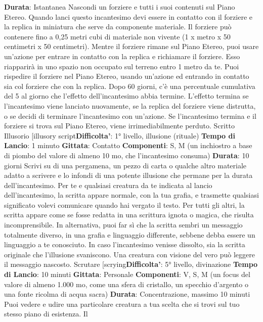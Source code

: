 \begin{multicols}{2}
\textbf{Durata}: Istantanea
Nascondi un forziere e tutti i suoi contenuti sul Piano
Etereo. Quando lanci questo incantesimo devi essere in
contatto con il forziere e la replica in miniatura che
serve da componente materiale. Il forziere può
contenere fino a 0,25 metri cubi di materiale non
vivente (1 x metro x 50 centimetri x 50 centimetri).
Mentre il forziere rimane sul Piano Etereo, puoi usare
un’azione per entrare in contatto con la replica e
richiamare il forziere. Esso riapparirà in uno spazio non
occupato sul terreno entro 1 metro da te. Puoi
rispedire il forziere nel Piano Etereo, usando un’azione
ed entrando in contatto sia col forziere che con la
replica.
Dopo 60 giorni, c’è una percentuale cumulativa del 5%
al giorno che l’effetto dell’incantesimo abbia termine.
L’effetto termina se l’incantesimo viene lanciato
nuovamente, se la replica del forziere viene distrutta, o
se decidi di terminare l’incantesimo con un’azione. Se
l’incantesimo termina e il forziere si trova sul Piano
Etereo, viene irrimediabilmente perduto.
Scritto Illusorio
[illusory script\textbf{Difficolta'}:
1° livello, illusione (rituale)
\textbf{Tempo di Lancio}: 1 minuto
\textbf{Gittata}: Contatto
\textbf{Componenti}: S, M (un inchiostro a base di piombo del
valore di almeno 10 mo, che l’incantesimo consuma)
\textbf{Durata}: 10 giorni
Scrivi su di una pergamena, un pezzo di carta o
qualche altro materiale adatto a scrivere e lo infondi di
una potente illusione che permane per la durata
dell’incantesimo.
Per te e qualsiasi creatura da te indicata al lancio
dell’incantesimo, la scritta appare normale, con la tua
grafia, e trasmette qualsiasi significato volevi
comunicare quando hai vergato il testo. Per tutti gli altri,
la scritta appare come se fosse redatta in una scrittura
ignota o magica, che risulta incomprensibile. In
alternativa, puoi far sì che la scritta sembri un
messaggio totalmente diverso, in una grafia e
linguaggio differente, sebbene debba essere un
linguaggio a te conosciuto.
In caso l’incantesimo venisse dissolto, sia la scritta
originale che l’illusione svaniscono.
Una creatura con visione del vero può leggere il
messaggio nascosto.
Scrutare
[scrying\textbf{Difficolta'}:
5° livello, divinazione
\textbf{Tempo di Lancio}: 10 minuti
\textbf{Gittata}: Personale
\textbf{Componenti}: V, S, M (un focus del valore di almeno
1.000 mo, come una sfera di cristallo, un specchio
d’argento o una fonte ricolma di acqua sacra)
\textbf{Durata}: Concentrazione, massimo 10 minuti
Puoi vedere e udire una particolare creatura a tua
scelta che si trovi sul tuo stesso piano di esistenza. Il

\end{multicols}
